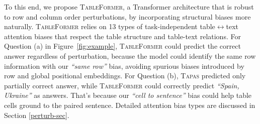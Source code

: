 \documentclass[11pt]{article}
\newcommand{\su}[1]{{\color{blue} SU: #1}}
\newcommand{\ag}[1]{{\color{blue} AG: #1}}
\begin{document}
To this end, we propose \textsc{TableFormer}, a Transformer architecture that is robust to row and column order perturbations, by incorporating structural biases more naturally. \textsc{TableFormer} relies on 13 types of task-independent table$\leftrightarrow$text attention biases that respect the table structure and table-text relations.
For Question (a) in Figure~\ref{fig:example}, \textsc{TableFormer} could predict the correct answer regardless of perturbation, because the model could identify the same row information with our \emph{``same row''} bias,  avoiding spurious biases introduced by row and global positional embeddings. %
For Question (b), \textsc{Tapas} predicted only partially correct answer, while \textsc{TableFormer} could correctly predict \emph{``Spain, Ukraine''} as answers. That's because our \emph{``cell to sentence''} bias could help table cells ground to the paired sentence. Detailed attention bias types are discussed in Section \ref{perturb-sec}.%
\end{document}
